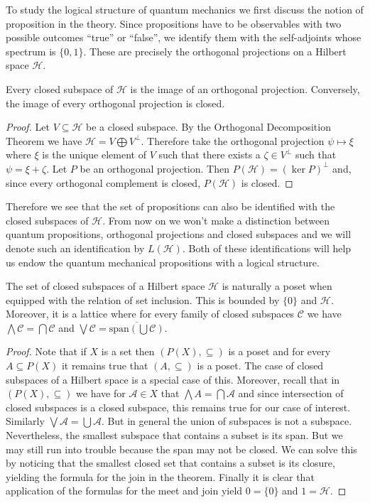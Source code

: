 To study the logical structure of quantum mechanics we first discuss the notion of proposition in the theory. Since propositions have to be observables with two possible outcomes ``true'' or ``false'', we identify them with the self-adjoints whose spectrum is $\{0,1\}$. These are precisely the orthogonal projections on a Hilbert space $\mathcal{H}$.

\begin{theorem}
Every closed subspace of $\mathcal{H}$ is the image of an orthogonal projection. Conversely, the image of every orthogonal projection is closed.
\end{theorem}
\begin{proof}
Let $V\subseteq\mathcal{H}$ be a closed subspace.  By the Orthogonal Decomposition Theorem we have $\mathcal{H}=V\bigoplus V^{\bot}$. Therefore take the orthogonal projection $\psi\mapsto\xi$ where $\xi$ is the unique element of $V$ such that there exists a $\zeta\in V^{\bot}$ such that $\psi=\xi+\zeta$.
Let $P$ be an orthogonal projection. Then $P(\mathcal{H})=(\ker P)^{\bot}$ and, since every orthogonal complement is closed, $P(\mathcal{H})$ is closed.
\end{proof}

Therefore we see that the set of propositions can also be identified with the closed subspaces of $\mathcal{H}$. From now on we won't make a distinction between quantum propositions, orthogonal projections and closed subspaces and we will denote such an identification by $L(\mathcal{H})$. Both of these identifications will help us endow the quantum mechanical propositions with a logical structure.

\begin{theorem}\label{thm:quantum_complements}
The set of closed subspaces of a Hilbert space $\mathcal{H}$ is naturally a poset when equipped with the relation of set inclusion. This is bounded by $\{0\}$ and $\mathcal{H}$. Moreover, it is a lattice where for every family of closed subspaces $\mathcal{C}$ we have $\bigwedge \mathcal{C} = \bigcap \mathcal{C}$ and $\bigvee \mathcal{C} = \overline{\text{span}\left(\bigcup\mathcal{C}\right)}$.
\end{theorem}

\begin{proof}
Note that if $X$ is a set then $(P(X),\subseteq)$ is a poset and for every $A\subseteq P(X)$ it remains true that $(A,\subseteq)$ is a poset. The case of closed subspaces of a Hilbert space is a special case of this. Moreover, recall that in $(P(X),\subseteq)$ we have for $\mathcal{A}\in X$ that $\bigwedge A = \bigcap \mathcal{A}$ and since intersection of closed subspaces is a closed subspace, this remains true for our case of interest. Similarly $\bigvee\mathcal{A}=\bigcup\mathcal{A}$. But in general the union of subspaces is not a subspace. Nevertheless, the smallest subspace that contains a subset is its span. But we may still run into trouble because the span may not be closed. We can solve this by noticing that the smallest closed set that contains a subset is its closure, yielding the formula for the join in the theorem. Finally it is clear that application of the formulas for the meet and join yield $0=\{0\}$ and $1=\mathcal{H}$. 
\end{proof}

